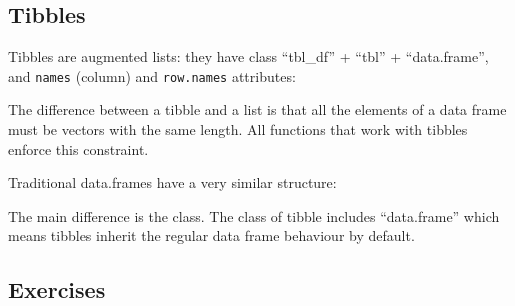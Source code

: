 \documentclass[]{book}
\newenvironment{Shaded}{\begin{snugshade}}{\end{snugshade}}
\newcommand{\KeywordTok}[1]{\textcolor[rgb]{0.13,0.29,0.53}{\textbf{{#1}}}}
\newcommand{\DataTypeTok}[1]{\textcolor[rgb]{0.13,0.29,0.53}{{#1}}}
\newcommand{\DecValTok}[1]{\textcolor[rgb]{0.00,0.00,0.81}{{#1}}}
\newcommand{\StringTok}[1]{\textcolor[rgb]{0.31,0.60,0.02}{{#1}}}
\newcommand{\CommentTok}[1]{\textcolor[rgb]{0.56,0.35,0.01}{\textit{{#1}}}}
\newcommand{\NormalTok}[1]{{#1}}
\begin{document}
\hypertarget{tibbles-1}{\subsection{Tibbles}\label{tibbles-1}}

Tibbles are augmented lists: they have class ``tbl\_df'' + ``tbl'' +
``data.frame'', and \texttt{names} (column) and \texttt{row.names}
attributes:

\begin{Shaded}
\end{Shaded}

The difference between a tibble and a list is that all the elements of a
data frame must be vectors with the same length. All functions that work
with tibbles enforce this constraint.

Traditional data.frames have a very similar structure:

\begin{Shaded}
\end{Shaded}

The main difference is the class. The class of tibble includes
``data.frame'' which means tibbles inherit the regular data frame
behaviour by default.

\subsection{Exercises}\label{exercises-54}
\end{document}
